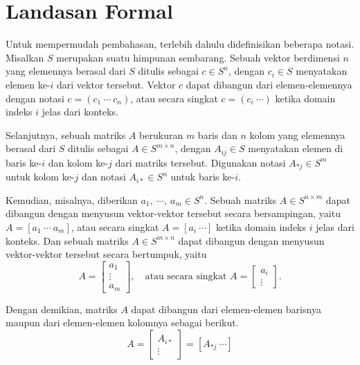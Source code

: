 \section{Landasan Formal}

Untuk mempermudah pembahasan, terlebih dahulu didefinisikan beberapa notasi. Misalkan \(S\) merupakan suatu himpunan sembarang. Sebuah vektor berdimensi \(n\) yang elemennya berasal dari \(S\) ditulis sebagai \(c \in S^n\), dengan \(c_i \in S\) menyatakan elemen ke-\(i\) dari vektor tersebut. Vektor \(c\) dapat dibangun dari elemen-elemennya dengan notasi \(c = (c_1\ \cdots\ c_n)\), atau secara singkat \(c = (c_i\ \cdots)\) ketika domain indeks \(i\) jelas dari konteks.

Selanjutnya, sebuah matriks \(A\) berukuran \(m\) baris dan \(n\) kolom yang elemennya berasal dari \(S\) ditulis sebagai \(A \in S^{m\times n}\), dengan \(A_{ij} \in S\) menyatakan elemen di baris ke-\(i\) dan kolom ke-\(j\) dari matriks tersebut. Digunakan notasi \(A_{*j} \in S^m\) untuk kolom ke-\(j\) dan notasi \(A_{i*} \in S^n\) untuk baris ke-\(i\).

Kemudian, misalnya, diberikan \(a_1,\ \cdots,\ a_m \in S^n\). Sebuah matriks \(A \in S^{n\times m}\) dapat dibangun dengan menyusun vektor-vektor tersebut secara bersampingan, yaitu \(A = [a_1\ \cdots\ a_m]\), atau secara singkat \(A = [a_i\ \cdots]\) ketika domain indeks \(i\) jelas dari konteks. Dan sebuah matriks \(A \in S^{m\times n}\) dapat dibangun dengan menyusun vektor-vektor tersebut secara bertumpuk, yaitu
	\[ A = \left[ \begin{array}{c} a_1\\ \vdots\\ a_m \end{array} \right], \quad \text{atau secara singkat } A = \left[ \begin{array}{c} a_i\\ \vdots \end{array} \right] \text{.}\]

Dengan demikian, matriks \(A\) dapat dibangun dari elemen-elemen barisnya maupun dari elemen-elemen kolomnya sebagai berikut.
	\[ A = \left[ \begin{array}{c} A_{i*}\\ \vdots \end{array} \right] = [A_{*j}\ \cdots] \]

